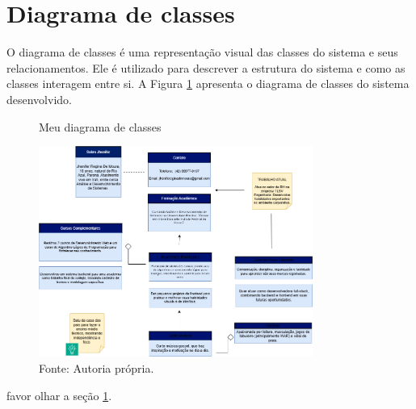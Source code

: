 \section{Diagrama de classes}
\label{sec:class}
O diagrama de classes é uma representação visual das classes do sistema e seus relacionamentos. Ele é utilizado para descrever a estrutura do sistema e como as classes interagem entre si. A Figura \ref{fig:Diagrama_de_classes} apresenta o diagrama de classes do sistema desenvolvido.
\begin{figure} [h!]	
    \centering
    \caption{Meu diagrama de classes}
    \includegraphics[width=0.8\textwidth]{Figures/Diagrama_de_Classes.png}
    \caption*{Fonte: Autoria própria.}
    \label{fig:Diagrama_de_classes}
\end{figure}

favor olhar a seção \ref{sec:class}.


